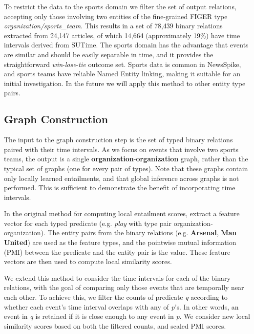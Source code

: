 \documentclass[11pt]{article}
\begin{document}
To restrict the data to the sports domain we filter the set of output relations, accepting only those involving two entities of the fine-grained FIGER type \textit{organization/sports\_team}. This results in a set of 78,439 binary relations extracted from 24,147 articles, of which 14,664 (approximately 19\%) have time intervals derived from SUTime. The sports domain has the advantage that events are similar and should be easily separable in time, and it provides the straightforward \textit{win}-\textit{lose}-\textit{tie} outcome set. Sports data is common in NewsSpike, and sports teams have reliable Named Entity linking, making it suitable for an initial investigation. In the future we will apply this method to other entity type pairs.


\subsection{Graph Construction}
\label{subsec:graph_construction}

The input to the graph construction step is the set of typed binary relations paired with their time intervals. As we focus on events that involve two sports teams, the output is a single \textbf{organization}-\textbf{organization} graph, rather than the typical set of graphs (one for every pair of types). Note that these graphs contain only locally learned entailments, and that global inference across graphs is not performed. This is sufficient to demonstrate the benefit of incorporating time intervals.

In the original method for computing local entailment scores,  extract a feature vector for each typed predicate (e.g. \textit{play} with type pair organization-organization). The entity pairs from the binary relations (e.g. \textbf{Arsenal}, \textbf{Man United}) are used as the feature types, and the pointwise mutual information (PMI) between the predicate and the entity pair is the value. These feature vectors are then used to compute local similarity scores. 

We extend this method to consider the time intervals for each of the binary relations, with the goal of comparing only those events that are temporally near each other. To achieve this, we filter the counts of predicate \textit{q} according to whether each event's time interval overlaps with any of \textit{p}'s. In other words, an event in \textit{q} is retained if it is close enough to any event in \textit{p}. We consider new local similarity scores based on both the filtered counts, and scaled PMI scores. 
\end{document}
